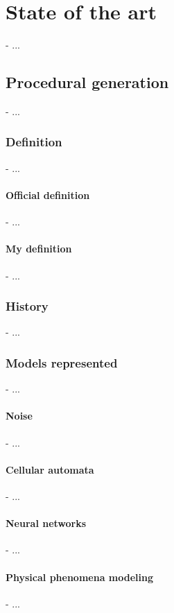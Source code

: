 \chapter{State of the art}
\label{chap:state-of-the-art}
\minitoc

- ...

\section{Procedural generation}
\label{sec:state-of-the-art_procedural-generation}
- ...

\subsection{Definition}
- ...

\subsubsection{Official definition}
- ...

\subsubsection{My definition}
- ...

\subsection{History}
- ...

\subsection{Models represented}
- ...

\subsubsection{Noise}
- ...

\subsubsection{Cellular automata}
- ...

\subsubsection{Neural networks}
- ...

\subsubsection{Physical phenomena modeling}
- ...

